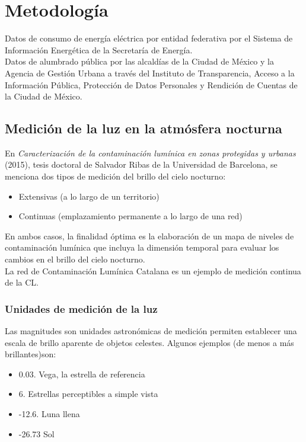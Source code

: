 \chapter{Metodología}

Datos de consumo de energía eléctrica por entidad federativa por el Sistema de Información Energética de la Secretaría de Energía.\\

Datos de alumbrado pública por las alcaldías de la Ciudad de México y la Agencia de Gestión Urbana a través del Instituto de Transparencia, Acceso a la Información Pública, Protección de Datos Personales y Rendición de Cuentas de la Ciudad de México.

\section{Medición de la luz en la atmósfera nocturna}

En \textit{Caracterización de la contaminación lumínica en zonas protegidas y urbanas} (2015), tesis doctoral de Salvador Ribas de la Universidad de Barcelona, se menciona dos tipos de medición del brillo del cielo nocturno:

\begin{itemize}

    \item Extensivas (a lo largo de un territorio)
    \item Continuas (emplazamiento permanente a lo largo de una red)     
    
\end{itemize}

En ambos casos, la finalidad óptima es la elaboración de un mapa de niveles de contaminación lumínica que incluya la dimensión temporal para evaluar los cambios en el brillo del cielo nocturno.\\

La red de Contaminación Lumínica Catalana es un ejemplo de medición continua de la CL.

\subsection{Unidades de medición de la luz}

Las magnitudes son unidades astronómicas de medición permiten establecer una escala de brillo aparente de objetos celestes. Algunos ejemplos (de menos a más brillantes)son:

\begin{itemize}

    \item 0.03. Vega, la estrella de referencia
    \item 6. Estrellas perceptibles a simple vista
    \item -12.6. Luna llena
    \item -26.73 Sol
    
 \end{itemize}
 

